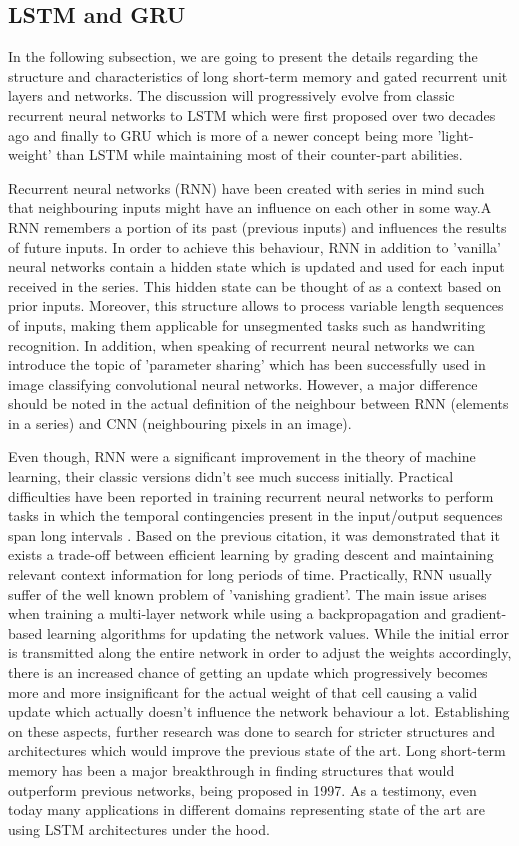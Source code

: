 \subsection{LSTM and GRU}
In the following subsection, we are going to present the details regarding the structure and characteristics of long short-term memory and gated recurrent unit layers and networks. The discussion will progressively evolve from classic recurrent neural networks to LSTM which were first proposed over two decades ago and finally to GRU which is more of a newer concept being more 'light-weight' than LSTM while maintaining most of their counter-part abilities.

Recurrent neural networks (RNN) have been created with series in mind such that neighbouring inputs might have an influence on each other in some way.A RNN remembers a portion of its past (previous inputs) and influences the results of future inputs. In order to achieve this behaviour, RNN in addition to 'vanilla' neural networks contain a hidden state which is updated and used for each input received in the series. This hidden state can be thought of as a context based on prior inputs. Moreover, this structure allows to process variable length sequences of inputs, making them applicable for unsegmented tasks such as handwriting recognition. In addition, when speaking of recurrent neural networks we can introduce the topic of 'parameter sharing' which has been successfully used in image classifying convolutional neural networks. However, a major difference should be noted in the actual definition of the neighbour between RNN (elements in a series) and CNN (neighbouring pixels in an image).

Even though, RNN were a significant improvement in the theory of machine learning, their classic versions didn't see much success initially. Practical difficulties have been reported in training recurrent neural networks to perform tasks in which the temporal contingencies present in the input/output sequences span long intervals \cite{bengio1994learning}. Based on the previous citation, it was demonstrated that it exists a trade-off between efficient learning by grading descent and maintaining relevant context information for long periods of time. Practically, RNN usually suffer of the well known problem of 'vanishing gradient'. The main issue arises when training a multi-layer network while using a backpropagation and gradient-based learning algorithms for updating the network values. While the initial error is transmitted along the entire network in order to adjust the weights accordingly, there is an increased chance of getting an update which progressively becomes more and more insignificant for the actual weight of that cell causing a valid update which actually doesn't influence the network behaviour a lot.  Establishing on these aspects, further research was done to search for stricter structures and architectures which would improve the previous state of the art. Long short-term memory has been a major breakthrough in finding structures that would outperform previous networks, being proposed in 1997. As a testimony, even today many applications in different domains representing state of the art are using LSTM architectures under the hood.

